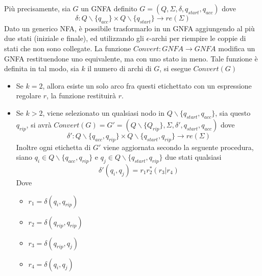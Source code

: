 \documentclass[10pt, letterpaper]{report}
\begin{document}
Più precisamente, sia $G$ un GNFA definito $G=(Q,\Sigma,\delta,q_{start},q_{acc})$ dove 
$$ \delta : Q\backslash \{q_{acc}\} \times Q\backslash \{q_{start}\}\rightarrow re(\Sigma)$$
Dato un generico NFA, è possibile trasformarlo in un GNFA aggiungendo al più due stati (iniziale e 
finale), ed utilizzando gli $\epsilon$-archi per riempire le coppie di stati che non sono collegate.\acc 
La funzione $Convert : GNFA \rightarrow GNFA$ modifica un GNFA restituendone uno equivalente, ma con uno stato in meno. 
Tale funzione è definita in tal modo, sia $k$ il numero di archi di $G$, si esegue $Convert(G)$ \begin{itemize}
    \item Se $k=2$, allora esiste un solo arco fra questi etichettato con un espressione regolare $r$, la funzione 
    restituirà $r$. 
    \item Se $k> 2$, viene selezionato un qualsiasi nodo in $Q\backslash\{q_{start},q_{acc}\}$, sia questo $q_{rip}$, 
    si avrà $Convert(G)=G'=(Q\backslash\{Q_{rip}\},\Sigma,\delta',q_{start},q_{acc})$ dove 
    $$ \delta' : Q\backslash \{q_{acc},q_{rip}\} \times Q\backslash \{q_{start},q_{rip}\}\rightarrow re(\Sigma)$$
    Inoltre ogni etichetta di $G'$ viene aggiornata secondo la seguente procedura, siano $q_i\in Q\backslash \{q_{acc},q_{rip}\}$
    e  $q_j\in Q\backslash \{q_{start},q_{rip}\}$ due stati qualsiasi 
    $$ \delta'(q_i,q_j)=r_1r_2^*(r_3|r_4)$$
    Dove \begin{itemize}
        \item $r_1=\delta(q_i,q_{rip})$
        \item $r_2=\delta(q_{rip},q_{rip})$
        \item $r_3=\delta(q_{rip},q_j)$
        \item $r_4=\delta(q_i,q_j)$
    \end{itemize}
\end{itemize}
\begin{figure}[h!]
    \centering
\end{figure}
\end{document}
